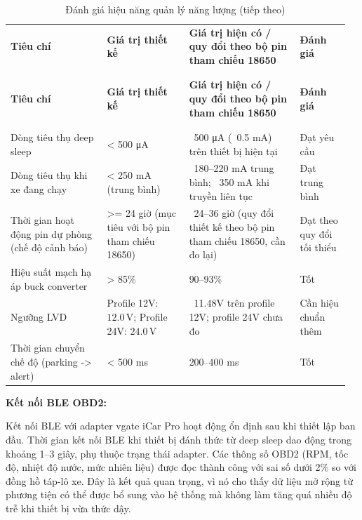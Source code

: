 \documentclass[a4paper]{extarticle}
\newcommand{\thesissettableid}[2]{%
  \renewcommand{\thetable}{#1}%
  \renewcommand{\theHtable}{#2}%
}
\begin{document}
{\thesissettableid{5.1}{tab-ch5-anh-gia-hieu-nang-quan-ly-nang-luong}
\def\LTcaptype{table}
\begin{longtable}{|L{0.272\linewidth}|L{0.231\linewidth}|L{0.311\linewidth}|L{0.141\linewidth}|}
\caption{Đánh giá hiệu năng quản lý năng lượng}\label{tab:ch5-anh-gia-hieu-nang-quan-ly-nang-luong}\\
\hline \textbf{Tiêu chí} & \textbf{Giá trị thiết kế} & \textbf{Giá trị hiện có / quy đổi theo bộ pin tham chiếu
18650} & \textbf{Đánh giá} \\
\\\hline
\endfirsthead
\caption[]{Đánh giá hiệu năng quản lý năng lượng (tiếp theo)}\\
\hline \textbf{Tiêu chí} & \textbf{Giá trị thiết kế} & \textbf{Giá trị hiện có / quy đổi theo bộ pin tham chiếu
18650} & \textbf{Đánh giá} \\
\\\hline
\endhead
\\\hline
\endfoot
\endlastfoot
Dòng tiêu thụ deep sleep & \textless{} 500 μA & ~500 μA
(~0.5 mA) trên thiết bị hiện tại & Đạt yêu cầu \\\hline
Dòng tiêu thụ khi xe đang chạy & \textless{} 250 mA (trung bình) &
~180--220 mA trung bình; ~350 mA khi truyền
liên tục & Đạt trung bình \\\hline
Thời gian hoạt động pin dự phòng (chế độ cảnh báo) & \textgreater= 24 giờ
(mục tiêu với bộ pin tham chiếu 18650) & ~24--36 giờ (quy đổi thiết kế theo
bộ pin tham chiếu 18650, cần đo lại) & Đạt theo quy đổi tối thiểu \\\hline
Hiệu suất mạch hạ áp buck converter & \textgreater{} 85\% & 90--93\% & Tốt \\\hline
Ngưỡng LVD & Profile 12V: \(12.0\,\mathrm{V}\); Profile 24V: \(24.0\,\mathrm{V}\) &
~11.48V trên profile 12V; profile 24V chưa đo & Cần hiệu
chuẩn thêm \\\hline
Thời gian chuyển chế độ (parking -\textgreater{} alert) & \textless{}
500 ms & 200--400 ms & Tốt \\\hline
\end{longtable}
}


\textbf{Kết nối BLE OBD2:}

Kết nối BLE với adapter vgate iCar Pro hoạt động ổn định sau khi thiết
lập ban đầu. Thời gian kết nối BLE khi thiết bị đánh thức từ deep sleep
dao động trong khoảng 1--3 giây, phụ thuộc trạng thái adapter. Các thông
số OBD2 (RPM, tốc độ, nhiệt độ nước, mức nhiên liệu) được đọc thành công
với sai số dưới 2\% so với đồng hồ táp-lô xe. Đây là kết quả quan trọng,
vì nó cho thấy dữ liệu mở rộng từ phương tiện có thể được bổ sung vào
hệ thống mà không làm tăng quá nhiều độ trễ khi thiết bị vừa thức dậy.
\end{document}
